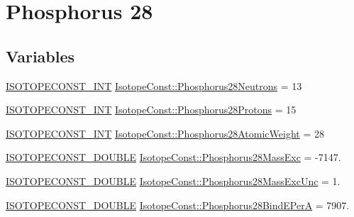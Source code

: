 \hypertarget{group___isotope_const-_phosphorus-_p28}{}\section{Phosphorus 28}
\label{group___isotope_const-_phosphorus-_p28}
\subsection*{Variables}
\begin{DoxyCompactItemize}
\item 
\mbox{\hyperlink{group___isotope_const-_macros_ga5f18360b3e99483a35c32d789e62621c}{I\+S\+O\+T\+O\+P\+E\+C\+O\+N\+S\+T\+\_\+\+I\+NT}} \mbox{\hyperlink{group___isotope_const-_phosphorus-_p28_ga6e04811c49f91917df0ef5a3c98a6b3a}{Isotope\+Const\+::\+Phosphorus28\+Neutrons}} = 13
\item 
\mbox{\hyperlink{group___isotope_const-_macros_ga5f18360b3e99483a35c32d789e62621c}{I\+S\+O\+T\+O\+P\+E\+C\+O\+N\+S\+T\+\_\+\+I\+NT}} \mbox{\hyperlink{group___isotope_const-_phosphorus-_p28_ga49d8d18ff48b7765889ed86df8ddcf7b}{Isotope\+Const\+::\+Phosphorus28\+Protons}} = 15
\item 
\mbox{\hyperlink{group___isotope_const-_macros_ga5f18360b3e99483a35c32d789e62621c}{I\+S\+O\+T\+O\+P\+E\+C\+O\+N\+S\+T\+\_\+\+I\+NT}} \mbox{\hyperlink{group___isotope_const-_phosphorus-_p28_gae78f6ccdcce4c6ffbbd527d632b072a0}{Isotope\+Const\+::\+Phosphorus28\+Atomic\+Weight}} = 28
\item 
\mbox{\hyperlink{group___isotope_const-_macros_ga8f45a7272ce02c0b4c65c44636ed719a}{I\+S\+O\+T\+O\+P\+E\+C\+O\+N\+S\+T\+\_\+\+D\+O\+U\+B\+LE}} \mbox{\hyperlink{group___isotope_const-_phosphorus-_p28_ga659368b896ed8a3d4aad3cd4865196ca}{Isotope\+Const\+::\+Phosphorus28\+Mass\+Exc}} = -\/7147.
\item 
\mbox{\hyperlink{group___isotope_const-_macros_ga8f45a7272ce02c0b4c65c44636ed719a}{I\+S\+O\+T\+O\+P\+E\+C\+O\+N\+S\+T\+\_\+\+D\+O\+U\+B\+LE}} \mbox{\hyperlink{group___isotope_const-_phosphorus-_p28_ga037451e7735e0ce9eb025ef0e9d6d925}{Isotope\+Const\+::\+Phosphorus28\+Mass\+Exc\+Unc}} = 1.
\item 
\mbox{\hyperlink{group___isotope_const-_macros_ga8f45a7272ce02c0b4c65c44636ed719a}{I\+S\+O\+T\+O\+P\+E\+C\+O\+N\+S\+T\+\_\+\+D\+O\+U\+B\+LE}} \mbox{\hyperlink{group___isotope_const-_phosphorus-_p28_ga7eefbe77aaf1103191488c9cee63364b}{Isotope\+Const\+::\+Phosphorus28\+Bind\+E\+PerA}} = 7907.
\item 

\end{DoxyCompactItemize}
